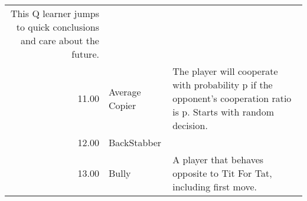 \begin{table}[!hbtp]
\begin{adjustbox}{width=2\textwidth, angle=90}
\begin{tabular}{rll}
	This Q learner jumps to quick conclusions and care about the future.                                                                                                                                                                                                                                                                                                                                                                                                                                                                                                                                                                                                                                                                                                                                                                                                                                                                      \\
	11.00  & Average Copier              & The player will cooperate with probability p if the opponent's cooperation ratio is p.
	Starts with random decision.                                                                                                                                                                                                                                                                                                                                                                                                                                                                                                                                                                                                                                                                                                                                                                                                                                                                                                  \\
	12.00  & BackStabber                 &                                                                                                                                   \\
	13.00  & Bully                       & A player that behaves opposite to Tit For Tat, including first move.


\end{tabular}
\end{adjustbox}
\end{table}
